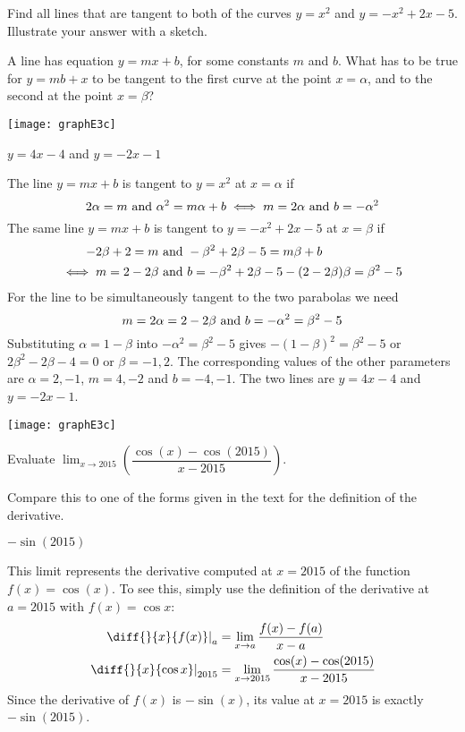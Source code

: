 \begin{Mquestion} [1998H]
Find all lines that are tangent to both of the curves $y=x^2$
and $y=-x^2+2x-5$. Illustrate your answer with a sketch.
\end{Mquestion}
\begin{hint} A line has equation $y=mx+b$, for some constants $m$ and $b$.
 What has to be true for $y=mb+x$ to be tangent to the first curve at the point $x=\alpha$, and to the second at the point $x=\beta$?
\end{hint}
\begin{answer}
\begin{center}
\texttt{[image: graphE3c]}
\end{center}
$y=4x-4$ and $y=-2x-1$
\end{answer}
\begin{solution}
The line $y=mx+b$ is tangent to $y=x^2$ at $x=\alpha$ if
$$
2\alpha=m\hbox{ and }\alpha^2=m\alpha+b
\iff m=2\alpha\hbox{ and }b=-\alpha^2
$$
The same line $y=mx+b$ is tangent to $y=-x^2+2x-5$ at $x=\beta$ if
\begin{align*}
-2\beta+2=m&\hbox{ and }-\beta^2+2\beta-5=m\beta+b\\
\iff m=2-2\beta&\hbox{ and }b=-\beta^2+2\beta-5-(2-2\beta)\beta=\beta^2-5
\end{align*}
For the line to be simultaneously tangent to the two parabolas we need
$$
m=2\alpha=2-2\beta\hbox{ and }b=-\alpha^2=\beta^2-5
$$
Substituting $\alpha=1-\beta$ into $-\alpha^2=\beta^2-5$ gives $-(1-\beta)^2=\beta^2-5$
or $2\beta^2-2\beta-4=0$ or $\beta=-1,2$. The corresponding values of the other
parameters are $\alpha=2,-1$, $m=4,-2$ and $b=-4,-1$. The two lines are
{$y=4x-4$ and $y=-2x-1$}.
\begin{center}
\texttt{[image: graphE3c]}
\end{center}
\end{solution}


\begin{question}[2015Q]
 Evaluate $\displaystyle \lim_{x\to 2015}\left(
\dfrac{\cos(x)-\cos(2015)}{x-2015}\right).$
\end{question}
\begin{hint}
Compare this to one of the forms given in the text for the definition of the derivative.
\end{hint}
\begin{answer}
{$-\sin(2015)$}
\end{answer}
\begin{solution}
This limit represents the derivative computed at $x=2015$ of the function
$f(x)=\cos(x)$. To see this, simply use the definition of the derivative at $a=2015$ with $f(x)=\cos x$:
\begin{align*}
\left.\diff{}{x}\{f(x)\}\right|_{a} &= \lim_{x \to a}\frac{f(x)-f(a)}{x-a}\\
\left.\diff{}{x}\{\cos x\}\right|_{2015} &= \lim_{x\to2015}\frac{\cos(x)-\cos(2015)}{x-2015}
\end{align*}
Since the derivative of $f(x)$ is $-\sin(x)$, its value at
$x=2015$ is exactly $-\sin(2015)$.
\end{solution}




